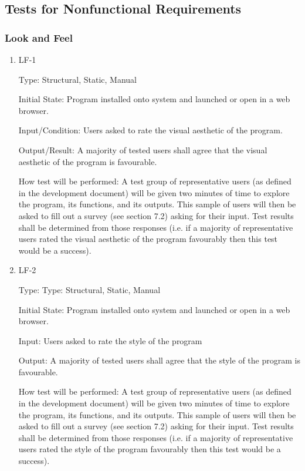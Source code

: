 \documentclass[12pt, titlepage]{article}
\begin{document}
\subsection{Tests for Nonfunctional Requirements}

\subsubsection{Look and Feel}

\begin{enumerate}

\item{LF-1\\}

Type: Structural, Static, Manual
					
Initial State: Program installed onto system and launched or open in a web 
browser.
					
Input/Condition: Users asked to rate the visual aesthetic of the program.
					
Output/Result: A majority of tested users shall agree that the visual aesthetic 
of the program is favourable.
					
How test will be performed: A test group of representative users (as defined in 
the development document) will be given two minutes of time to explore the 
program, its functions, and its outputs. This sample of users will then be asked 
to fill out a survey (see section 7.2) asking for their input. Test results 
shall be determined from those responses (i.e. if a majority of representative 
users rated the visual aesthetic of the program favourably then this test would 
be a success).
					
\item{LF-2\\}

Type: Type: Structural, Static, Manual
					
Initial State: Program installed onto system and launched or open in a web 
browser.
					
Input: Users asked to rate the style of the program
					
Output: A majority of tested users shall agree that the style of the program is 
favourable.
					
How test will be performed: A test group of representative users (as defined in 
the development document) will be given two minutes of time to explore the 
program, its functions, and its outputs. This sample of users will then be asked 
to fill out a survey (see section 7.2) asking for their input. Test results 
shall be determined from those responses (i.e. if a majority of representative 
users rated the style of the program favourably then this test would be a 
success).

\end{enumerate}
\end{document}
